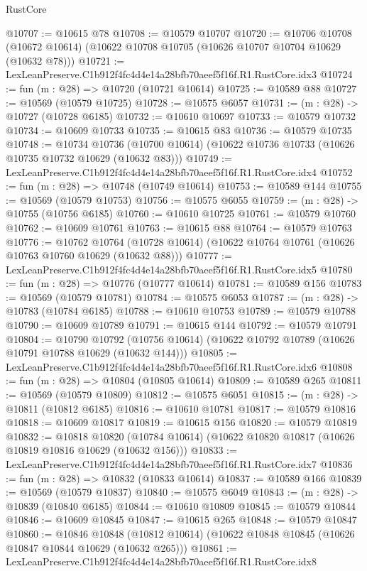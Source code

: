 \begin{lexlean}{RustCore}
\begin{coremodule}
@10707 := @10615 @78
@10708 := @10579 @10707
@10720 := @10706
    @10708
    (@10672 @10614)
    (@10622 @10708 @10705 (@10626 @10707 @10704 @10629 (@10632 @78)))
@10721 := LexLeanPreserve.C1b912f4fc4d4e14a28bfb70aeef5f16f.R1.RustCore.idx3
@10724 := fun (m : @28) => @10720 (@10721 @10614)
@10725 := @10589 @88
@10727 := @10569 (@10579 @10725)
@10728 := @10575 @6057
@10731 := (m : @28) -> @10727 (@10728 @6185)
@10732 := @10610 @10697
@10733 := @10579 @10732
@10734 := @10609 @10733
@10735 := @10615 @83
@10736 := @10579 @10735
@10748 := @10734
    @10736
    (@10700 @10614)
    (@10622 @10736 @10733 (@10626 @10735 @10732 @10629 (@10632 @83)))
@10749 := LexLeanPreserve.C1b912f4fc4d4e14a28bfb70aeef5f16f.R1.RustCore.idx4
@10752 := fun (m : @28) => @10748 (@10749 @10614)
@10753 := @10589 @144
@10755 := @10569 (@10579 @10753)
@10756 := @10575 @6055
@10759 := (m : @28) -> @10755 (@10756 @6185)
@10760 := @10610 @10725
@10761 := @10579 @10760
@10762 := @10609 @10761
@10763 := @10615 @88
@10764 := @10579 @10763
@10776 := @10762
    @10764
    (@10728 @10614)
    (@10622 @10764 @10761 (@10626 @10763 @10760 @10629 (@10632 @88)))
@10777 := LexLeanPreserve.C1b912f4fc4d4e14a28bfb70aeef5f16f.R1.RustCore.idx5
@10780 := fun (m : @28) => @10776 (@10777 @10614)
@10781 := @10589 @156
@10783 := @10569 (@10579 @10781)
@10784 := @10575 @6053
@10787 := (m : @28) -> @10783 (@10784 @6185)
@10788 := @10610 @10753
@10789 := @10579 @10788
@10790 := @10609 @10789
@10791 := @10615 @144
@10792 := @10579 @10791
@10804 := @10790
    @10792
    (@10756 @10614)
    (@10622 @10792 @10789 (@10626 @10791 @10788 @10629 (@10632 @144)))
@10805 := LexLeanPreserve.C1b912f4fc4d4e14a28bfb70aeef5f16f.R1.RustCore.idx6
@10808 := fun (m : @28) => @10804 (@10805 @10614)
@10809 := @10589 @265
@10811 := @10569 (@10579 @10809)
@10812 := @10575 @6051
@10815 := (m : @28) -> @10811 (@10812 @6185)
@10816 := @10610 @10781
@10817 := @10579 @10816
@10818 := @10609 @10817
@10819 := @10615 @156
@10820 := @10579 @10819
@10832 := @10818
    @10820
    (@10784 @10614)
    (@10622 @10820 @10817 (@10626 @10819 @10816 @10629 (@10632 @156)))
@10833 := LexLeanPreserve.C1b912f4fc4d4e14a28bfb70aeef5f16f.R1.RustCore.idx7
@10836 := fun (m : @28) => @10832 (@10833 @10614)
@10837 := @10589 @166
@10839 := @10569 (@10579 @10837)
@10840 := @10575 @6049
@10843 := (m : @28) -> @10839 (@10840 @6185)
@10844 := @10610 @10809
@10845 := @10579 @10844
@10846 := @10609 @10845
@10847 := @10615 @265
@10848 := @10579 @10847
@10860 := @10846
    @10848
    (@10812 @10614)
    (@10622 @10848 @10845 (@10626 @10847 @10844 @10629 (@10632 @265)))
@10861 := LexLeanPreserve.C1b912f4fc4d4e14a28bfb70aeef5f16f.R1.RustCore.idx8

\end{coremodule}
\end{lexlean}
